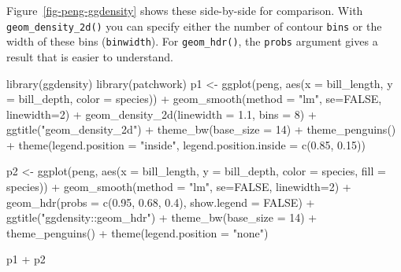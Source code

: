 \documentclass[
  letterpaper,
  10pt,
  krantz2]{krantz}
\makeatletter
\newenvironment{Shaded}{\begin{snugshade}}{\end{snugshade}}
\newcommand{\AttributeTok}[1]{\textcolor[rgb]{0.40,0.45,0.13}{#1}}
\newcommand{\ConstantTok}[1]{\textcolor[rgb]{0.56,0.35,0.01}{#1}}
\newcommand{\DecValTok}[1]{\textcolor[rgb]{0.68,0.00,0.00}{#1}}
\newcommand{\FloatTok}[1]{\textcolor[rgb]{0.68,0.00,0.00}{#1}}
\newcommand{\FunctionTok}[1]{\textcolor[rgb]{0.28,0.35,0.67}{#1}}
\newcommand{\NormalTok}[1]{\textcolor[rgb]{0.00,0.23,0.31}{#1}}
\newcommand{\OtherTok}[1]{\textcolor[rgb]{0.00,0.23,0.31}{#1}}
\newcommand{\SpecialCharTok}[1]{\textcolor[rgb]{0.37,0.37,0.37}{#1}}
\newcommand{\StringTok}[1]{\textcolor[rgb]{0.13,0.47,0.30}{#1}}
\newenvironment{kframe}{%
  \medskip{}
  \setlength{\fboxsep}{.8em}
  \def\at@end@of@kframe{}%
  \ifinner\ifhmode%
  \def\at@end@of@kframe{\end{minipage}}%
  \begin{minipage}{\columnwidth}%
  \fi\fi%
  \def\FrameCommand##1{\hskip\@totalleftmargin \hskip-\fboxsep
  \colorbox{shadecolor}{##1}\hskip-\fboxsep
      \hskip-\linewidth \hskip-\@totalleftmargin \hskip\columnwidth}%
  \MakeFramed {\advance\hsize-\width
    \@totalleftmargin\z@ \linewidth\hsize
    \@setminipage}}%
{\par\unskip\endMakeFramed%
  \at@end@of@kframe}
\renewenvironment{Shaded}{\begin{kframe}}{\end{kframe}}
\makeatother
\begin{document}
Figure~\ref{fig-peng-ggdensity} shows these side-by-side for comparison.
With \texttt{geom\_density\_2d()} you can specify either the number of
contour \texttt{bins} or the width of these bins (\texttt{binwidth}).
For \texttt{geom\_hdr()}, the \texttt{probs} argument gives a result
that is easier to understand.

\begin{Shaded}
\begin{Highlighting}[]
\FunctionTok{library}\NormalTok{(ggdensity)}
\FunctionTok{library}\NormalTok{(patchwork)}
\NormalTok{p1 }\OtherTok{\textless{}{-}} \FunctionTok{ggplot}\NormalTok{(peng, }
       \FunctionTok{aes}\NormalTok{(}\AttributeTok{x =}\NormalTok{ bill\_length, }\AttributeTok{y =}\NormalTok{ bill\_depth,}
           \AttributeTok{color =}\NormalTok{ species)) }\SpecialCharTok{+}
  \FunctionTok{geom\_smooth}\NormalTok{(}\AttributeTok{method =} \StringTok{"lm"}\NormalTok{,  }\AttributeTok{se=}\ConstantTok{FALSE}\NormalTok{, }\AttributeTok{linewidth=}\DecValTok{2}\NormalTok{) }\SpecialCharTok{+}
  \FunctionTok{geom\_density\_2d}\NormalTok{(}\AttributeTok{linewidth =} \FloatTok{1.1}\NormalTok{, }\AttributeTok{bins =} \DecValTok{8}\NormalTok{) }\SpecialCharTok{+}
  \FunctionTok{ggtitle}\NormalTok{(}\StringTok{"geom\_density\_2d"}\NormalTok{) }\SpecialCharTok{+}
  \FunctionTok{theme\_bw}\NormalTok{(}\AttributeTok{base\_size =} \DecValTok{14}\NormalTok{) }\SpecialCharTok{+} 
  \FunctionTok{theme\_penguins}\NormalTok{() }\SpecialCharTok{+}
  \FunctionTok{theme}\NormalTok{(}\AttributeTok{legend.position =} \StringTok{"inside"}\NormalTok{,}
        \AttributeTok{legend.position.inside =} \FunctionTok{c}\NormalTok{(}\FloatTok{0.85}\NormalTok{, }\FloatTok{0.15}\NormalTok{))}

\NormalTok{p2 }\OtherTok{\textless{}{-}} \FunctionTok{ggplot}\NormalTok{(peng, }
       \FunctionTok{aes}\NormalTok{(}\AttributeTok{x =}\NormalTok{ bill\_length, }\AttributeTok{y =}\NormalTok{ bill\_depth,}
           \AttributeTok{color =}\NormalTok{ species, }\AttributeTok{fill =}\NormalTok{ species)) }\SpecialCharTok{+}
  \FunctionTok{geom\_smooth}\NormalTok{(}\AttributeTok{method =} \StringTok{"lm"}\NormalTok{,  }\AttributeTok{se=}\ConstantTok{FALSE}\NormalTok{, }\AttributeTok{linewidth=}\DecValTok{2}\NormalTok{) }\SpecialCharTok{+}
  \FunctionTok{geom\_hdr}\NormalTok{(}\AttributeTok{probs =} \FunctionTok{c}\NormalTok{(}\FloatTok{0.95}\NormalTok{, }\FloatTok{0.68}\NormalTok{, }\FloatTok{0.4}\NormalTok{), }\AttributeTok{show.legend =} \ConstantTok{FALSE}\NormalTok{) }\SpecialCharTok{+}
  \FunctionTok{ggtitle}\NormalTok{(}\StringTok{"ggdensity::geom\_hdr"}\NormalTok{) }\SpecialCharTok{+}
  \FunctionTok{theme\_bw}\NormalTok{(}\AttributeTok{base\_size =} \DecValTok{14}\NormalTok{) }\SpecialCharTok{+}
  \FunctionTok{theme\_penguins}\NormalTok{() }\SpecialCharTok{+}
  \FunctionTok{theme}\NormalTok{(}\AttributeTok{legend.position =} \StringTok{"none"}\NormalTok{)}

\NormalTok{p1 }\SpecialCharTok{+}\NormalTok{ p2}
\end{Highlighting}
\end{Shaded}
\end{document}
